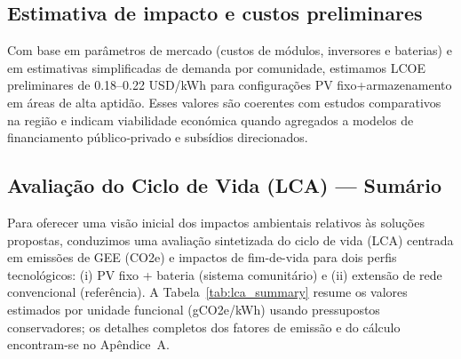 \documentclass[12pt, a4paper]{article}
\begin{document}
\begin{itemize}
\subsection{Estimativa de impacto e custos preliminares}

Com base em parâmetros de mercado (custos de módulos, inversores e baterias) e em estimativas simplificadas de demanda por comunidade, estimamos LCOE preliminares de 0.18–0.22 USD/kWh para configurações PV fixo+armazenamento em áreas de alta aptidão. Esses valores são coerentes com estudos comparativos na região e indicam viabilidade económica quando agregados a modelos de financiamento público‑privado e subsídios direcionados.

\begin{center}
\end{center}

\subsection{Avaliação do Ciclo de Vida (LCA) — Sumário}

Para oferecer uma visão inicial dos impactos ambientais relativos às soluções propostas, conduzimos
uma avaliação sintetizada do ciclo de vida (LCA) centrada em emissões de GEE (CO2e) e
impactos de fim-de-vida para dois perfis tecnológicos: (i) PV fixo + bateria (sistema comunitário)
e (ii) extensão de rede convencional (referência). A Tabela~\ref{tab:lca_summary} resume os
valores estimados por unidade funcional (gCO2e/kWh) usando pressupostos conservadores; os
detalhes completos dos fatores de emissão e do cálculo encontram-se no Apêndice~A.


\end{itemize}
\end{document}
